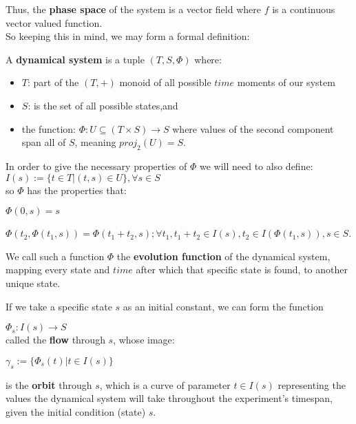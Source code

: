 Thus, the \textbf{phase space} of the system is a vector field where $f$ is a continuous vector valued function.\\

So keeping this in mind, we may form a formal definition:\\

\begin{definition}
    A \textbf{dynamical system} is a tuple $(T,S,\Phi)$ where: \\

    \begin{itemize}
        \item $T$: part of the $(T,+)$ monoid of all possible $time$ moments of our system
        \item $S$: is the set of all possible states,and
        \item the function: $\Phi : U \subseteq (T \times S ) \rightarrow S$ where values of the second component span all of $S$, meaning $proj_2(U) = S$.
    \end{itemize}
    In order to give the necessary properties of $\Phi$ we will need to also define: \\
    $I(s):= \{ t \in T | (t,s) \in U \}, \forall s \in S $\\

    so $\Phi$ has the properties that:

    $\Phi(0,s) = s$

    $\Phi(t_2,\Phi(t_1,s)) = \Phi(t_1+t_2,s); \forall t_1, t_1+t_2 \in I(s), t_2 \in I(\Phi(t_1,s)), s \in S$.

    We call such a function $\Phi$ the \textbf{evolution function} of the dynamical system, mapping every state and $time$ after which that specific state is found, to another unique state.
\end{definition}

If we take a specific state $s$ as an initial constant, we can form the function

$\Phi_s : I(s) \rightarrow S$ \\
called the \textbf{flow} through $s$, whose image:

$\gamma_s:=\{\Phi_s(t) | t\in I(s) \}$

is the \textbf{orbit} through $s$,
which is a curve of parameter $t \in I(s)$ representing the values the dynamical system will take throughout the experiment's timespan, given the initial condition (state) $s$.

\hspace{20 mm}

